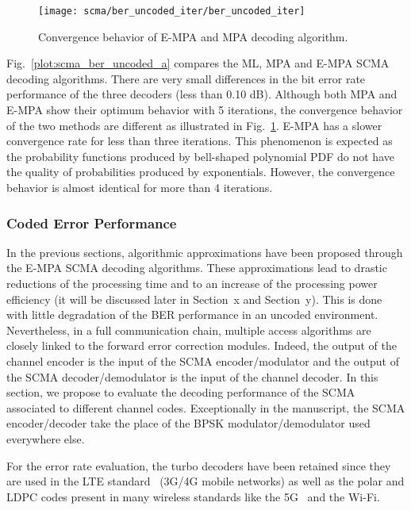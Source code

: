 \begin{figure}[htp]
  \centering
  \texttt{[image: scma/ber\_uncoded\_iter/ber\_uncoded\_iter]}
  \caption{Convergence behavior of E-MPA and MPA decoding algorithm.}
  \label{plot:scma_ber_uncoded_b}
\end{figure}

Fig.~\ref{plot:scma_ber_uncoded_a} compares the ML, MPA and E-MPA SCMA decoding
algorithms. There are very small differences in the bit error rate performance
of the three decoders (less than 0.10 dB). Although both MPA and E-MPA show
their optimum behavior with 5 iterations, the convergence behavior of the two
methods are different as illustrated in Fig.~\ref{plot:scma_ber_uncoded_b}.
E-MPA has a slower convergence rate for less than three iterations. This
phenomenon is expected as the probability functions produced by bell-shaped
polynomial PDF do not have the quality of probabilities produced by
exponentials. However, the convergence behavior is almost identical for more
than 4 iterations.

\subsubsection{Coded Error Performance}
\label{sec:scma_fec}

In the previous sections, algorithmic approximations have been proposed through
the E-MPA SCMA decoding algorithms. These approximations lead to drastic
reductions of the processing time and to an increase of the processing power
efficiency (it will be discussed later in Section~x and Section~y). This is done
with little degradation of the BER performance in an uncoded environment.
Nevertheless, in a full communication chain, multiple access algorithms are
closely linked to the forward error correction modules. Indeed, the output of
the channel encoder is the input of the SCMA encoder/modulator and the output of
the SCMA decoder/demodulator is the input of the channel decoder. In this
section, we propose to evaluate the decoding performance of the SCMA associated
to different channel codes. Exceptionally in the manuscript, the SCMA
encoder/decoder take the place of the BPSK modulator/demodulator used everywhere
else.

For the error rate evaluation, the turbo decoders have been retained since they
are used in the LTE standard~\cite{ETSI2013} (3G/4G mobile networks) as well
as the polar and LDPC codes present in many wireless standards like the
5G~\cite{ETSI2018} and the Wi-Fi.

